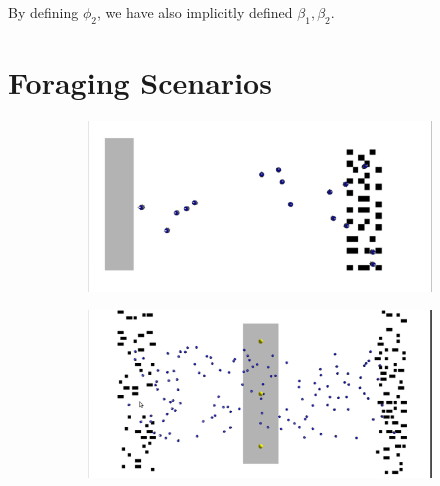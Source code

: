 By defining $\phi_2$, we have also implicitly defined $\beta_1,\beta_2$.

\section{Foraging Scenarios}\label{exp-setup:sec:foraging-scenarios}

\begin{figure}[!htbp]
  \begin{subfigure}{0.49\linewidth}
    {\includegraphics[]{figures/ss-foraging.png}}
  \end{subfigure}
  \begin{subfigure}{0.49\linewidth}
    \includegraphics[]{figures/ds-foraging.png}
  \end{subfigure}
  \begin{subfigure}{0.24\linewidth}

\end{subfigure}
\end{figure}
